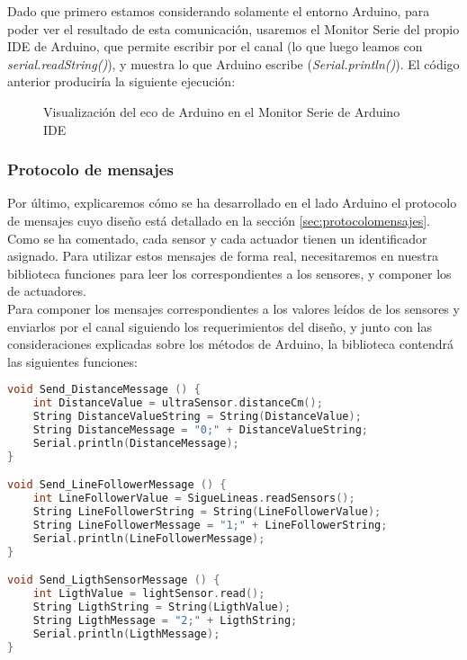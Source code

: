 Dado que primero estamos considerando solamente el entorno Arduino, para poder ver el resultado de esta comunicación, usaremos el Monitor Serie del propio IDE de Arduino, que permite escribir por el canal (lo que luego leamos con \textit{serial.readString()}), y muestra lo que Arduino escribe (\textit{Serial.println()}). El código anterior produciría la siguiente ejecución:
\begin{figure}[h]
	\centering	
	\begin{subfigure}
		[Escribir el String que Arduino lee del canal]{
			\texttt{[image: MonitorEnviar.png]}
			\label{img:ComunicacionArduinoEnviar}}
	\end{subfigure}
	\begin{subfigure}
		[Muestra el String que Arduino ha escrito en el canal]{
			\texttt{[image: MonitorRespuesta.png]}
			\label{img:ComunicacionArduinoLeer}}
	\end{subfigure}
	\label{img:ComunicacionArduinoMonitorSerie}
	\caption{Visualización del eco de Arduino en el Monitor Serie de Arduino IDE}
\end{figure}


\subsubsection{Protocolo de mensajes}\label{subsubsec:mensajesArduino}

Por último, explicaremos cómo se ha desarrollado en el lado Arduino el protocolo de mensajes cuyo diseño está detallado en la sección  \ref{sec:protocolomensajes}. \\
Como se ha comentado, cada sensor y cada actuador tienen un identificador asignado.
Para utilizar estos mensajes de forma real, necesitaremos en nuestra biblioteca funciones para leer los correspondientes a los sensores, y  componer los de actuadores. \\

Para componer los mensajes correspondientes a los valores leídos de los sensores y enviarlos por el canal siguiendo los requerimientos del diseño, y junto con las consideraciones explicadas sobre los métodos de Arduino, la biblioteca contendrá las siguientes funciones:
 
\begin{lstlisting}[language=C,caption={Envío de mensajes para los sensores}]
void Send_DistanceMessage () {
	int DistanceValue = ultraSensor.distanceCm();
	String DistanceValueString = String(DistanceValue);
	String DistanceMessage = "0;" + DistanceValueString; 
	Serial.println(DistanceMessage);
}

void Send_LineFollowerMessage () {
	int LineFollowerValue = SigueLineas.readSensors();
	String LineFollowerString = String(LineFollowerValue);
	String LineFollowerMessage = "1;" + LineFollowerString; 
	Serial.println(LineFollowerMessage);
}

void Send_LigthSensorMessage () {
	int LigthValue = lightSensor.read();
	String LigthString = String(LigthValue);
	String LigthMessage = "2;" + LigthString; 
	Serial.println(LigthMessage);
}
\end{lstlisting}

